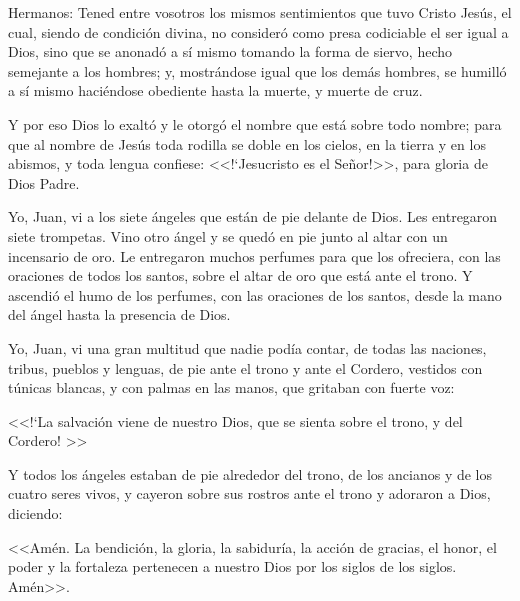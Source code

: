 
 Hermanos: Tened entre vosotros los mismos 
sentimientos que tuvo Cristo Jesús, el cual, 
siendo de condición divina, no consideró 
como presa codiciable el ser igual a Dios, sino 
que se anonadó a sí mismo tomando la forma 
de siervo, hecho semejante a los hombres; y, 
mostrándose igual que los demás hombres, se 
humilló a sí mismo haciéndose obediente
hasta la muerte, y muerte de cruz. 

 Y por eso 
Dios lo exaltó y le otorgó el nombre que está 
sobre todo nombre; para que al nombre de 
Jesús toda rodilla se doble en los cielos, en la 
tierra y en los abismos, y toda lengua confiese: 
<<!`Jesucristo es el Señor!>>, para gloria de Dios 
Padre. 





 
Yo, Juan, vi a los siete ángeles que están de pie delante de Dios. Les entregaron siete 
trompetas. Vino otro ángel y se quedó en pie 
junto al altar con un incensario de oro. Le 
entregaron muchos perfumes para que los 
ofreciera, con las oraciones de todos los santos, 
sobre el altar de oro que está ante el trono. Y 
ascendió el humo de los perfumes, con las 
oraciones de los santos, desde la mano del 
ángel hasta la presencia de Dios. 





 Yo, Juan, vi una gran multitud que nadie 
podía contar, de todas las naciones, tribus, 
pueblos y lenguas, de pie ante el trono y ante 
el Cordero, vestidos con túnicas blancas, y con 
palmas en las manos, que gritaban con fuerte 
voz:  

<<!`La salvación viene de nuestro Dios, que 
se sienta sobre el trono, y del Cordero! >>  

Y 
todos los ángeles estaban de pie alrededor del 
trono, de los ancianos y de los cuatro seres 
vivos, y cayeron sobre sus rostros ante el trono 
y adoraron a Dios, diciendo:  

<<Amén. La 
bendición, la gloria, la sabiduría, la acción de 
gracias, el honor, el poder y la fortaleza 
pertenecen a nuestro Dios por los siglos de los 
siglos. Amén>>. 



